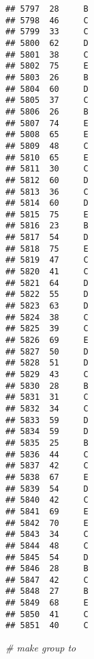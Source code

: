 \documentclass[
]{article}
\newenvironment{Shaded}{\begin{snugshade}}{\end{snugshade}}
\newcommand{\CommentTok}[1]{\textcolor[rgb]{0.56,0.35,0.01}{\textit{#1}}}
\newcommand{\FunctionTok}[1]{\textcolor[rgb]{0.00,0.00,0.00}{#1}}
\newcommand{\NormalTok}[1]{#1}
\newcommand{\OtherTok}[1]{\textcolor[rgb]{0.56,0.35,0.01}{#1}}
\newcommand{\SpecialCharTok}[1]{\textcolor[rgb]{0.00,0.00,0.00}{#1}}
\newcommand{\StringTok}[1]{\textcolor[rgb]{0.31,0.60,0.02}{#1}}
\begin{document}
\begin{verbatim}
## 5797  28     B
## 5798  46     C
## 5799  33     C
## 5800  62     D
## 5801  38     C
## 5802  75     E
## 5803  26     B
## 5804  60     D
## 5805  37     C
## 5806  26     B
## 5807  74     E
## 5808  65     E
## 5809  48     C
## 5810  65     E
## 5811  30     C
## 5812  60     D
## 5813  36     C
## 5814  60     D
## 5815  75     E
## 5816  23     B
## 5817  54     D
## 5818  75     E
## 5819  47     C
## 5820  41     C
## 5821  64     D
## 5822  55     D
## 5823  63     D
## 5824  38     C
## 5825  39     C
## 5826  69     E
## 5827  50     D
## 5828  51     D
## 5829  43     C
## 5830  28     B
## 5831  31     C
## 5832  34     C
## 5833  59     D
## 5834  59     D
## 5835  25     B
## 5836  44     C
## 5837  42     C
## 5838  67     E
## 5839  54     D
## 5840  42     C
## 5841  69     E
## 5842  70     E
## 5843  34     C
## 5844  48     C
## 5845  54     D
## 5846  28     B
## 5847  42     C
## 5848  27     B
## 5849  68     E
## 5850  41     C
## 5851  40     C
\end{verbatim}

\begin{Shaded}
\begin{Highlighting}[]
\CommentTok{\# make group to }
\end{Highlighting}
\end{Shaded}

\begin{Shaded}
\end{Shaded}
\end{document}
